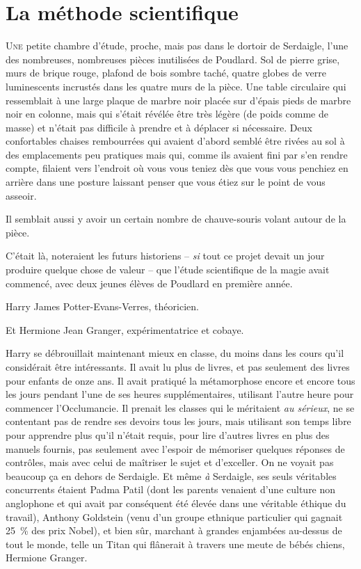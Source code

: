 \chapter{La méthode scientifique}

\lettrine{U}{ne} petite chambre d'étude, proche, mais pas dans le dortoir de Serdaigle, l'une des nombreuses, nombreuses pièces inutilisées de Poudlard. Sol de pierre grise, murs de brique rouge, plafond de bois sombre taché, quatre globes de verre luminescents incrustés dans les quatre murs de la pièce. Une table circulaire qui ressemblait à une large plaque de marbre noir placée sur d'épais pieds de marbre noir en colonne, mais qui s'était révélée être très légère (de poids comme de masse) et n'était pas difficile à prendre et à déplacer si nécessaire. Deux confortables chaises rembourrées qui avaient d'abord semblé être rivées au sol à des emplacements peu pratiques mais qui, comme ils avaient fini par s'en rendre compte, filaient vers l'endroit où vous vous teniez dès que vous vous penchiez en arrière dans une posture laissant penser que vous étiez sur le point de vous asseoir.

Il semblait aussi y avoir un certain nombre de chauve-souris volant autour de la pièce.

C'était là, noteraient les futurs historiens -- \emph{si} tout ce projet devait un jour produire quelque chose de valeur -- que l'étude scientifique de la magie avait commencé, avec deux jeunes élèves de Poudlard en première année.

Harry James Potter-Evans-Verres, théoricien.

Et Hermione Jean Granger, expérimentatrice et cobaye.

Harry se débrouillait maintenant mieux en classe, du moins dans les cours qu'il considérait être intéressants. Il avait lu plus de livres, et pas seulement des livres pour enfants de onze ans. Il avait pratiqué la métamorphose encore et encore tous les jours pendant l'une de ses heures supplémentaires, utilisant l'autre heure pour commencer l'Occlumancie. Il prenait les classes qui le méritaient \emph{au sérieux}, ne se contentant pas de rendre ses devoirs tous les jours, mais utilisant son temps libre pour apprendre plus qu'il n'était requis, pour lire d'autres livres en plus des manuels fournis, pas seulement avec l'espoir de mémoriser quelques réponses de contrôles, mais avec celui de maîtriser le sujet et d'exceller. On ne voyait pas beaucoup ça en dehors de Serdaigle. Et même \emph{à} Serdaigle, ses seuls véritables concurrents étaient Padma Patil (dont les parents venaient d'une culture non anglophone et qui avait par conséquent été élevée dans une véritable éthique du travail), Anthony Goldstein (venu d'un groupe ethnique particulier qui gagnait 25~\% des prix Nobel), et bien sûr, marchant à grandes enjambées au-dessus de tout le monde, telle un Titan qui flânerait à travers une meute de bébés chiens, Hermione Granger.

